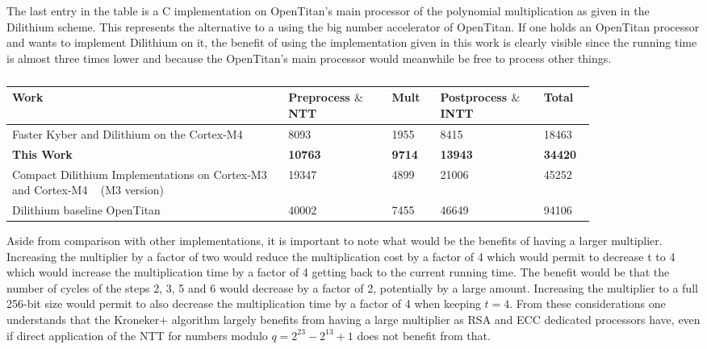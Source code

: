 The last entry in the table is a C implementation on OpenTitan's main processor of the polynomial multiplication as given in the Dilithium scheme. This represents the alternative to a using the big number accelerator of OpenTitan. If one holds an OpenTitan processor and wants to implement Dilithium on it, the benefit of using the implementation given in this work is clearly visible since the running time is almost three times lower and because the OpenTitan's main processor would meanwhile be free to process other things. 


\begin{table}[htpb]
    \caption[]{}\label{tab:comparison}
    \centering
    \begin{tabular}{p{0.4\linewidth} | p{0.15\linewidth} | p{0.07\linewidth} | p{0.15\linewidth} | p{0.07\linewidth}}
      \toprule
         Work & Preprocess $\&$ NTT & Mult & Postprocess $\&$ INTT & Total \\
      \midrule
         Faster Kyber and Dilithium on the Cortex-M4~\parencite{10.1007/978-3-031-09234-3_42} & 8093 & 1955 & 8415 & 18463  \\
         \hline
         \textbf{This Work} & \textbf{10763} & \textbf{9714} & \textbf{13943} & \textbf{34420} \\
         \hline
         Compact Dilithium Implementations on Cortex-M3 and Cortex-M4 ~\parencite{cryptoeprint:2020/1278} (M3 version) & 19347 & 4899 & 21006 & 45252 \\
         \hline 
         Dilithium baseline OpenTitan & 40002 & 7455 & 46649 & 94106 \\

      \bottomrule
    \end{tabular}
  \end{table}

  Aside from comparison with other implementations, it is important to note what would be the benefits of having a larger multiplier. Increasing the multiplier by a factor of two would reduce the multiplication cost by a factor of 4 which would permit to decrease t to 4 which would increase the multiplication time by a factor of 4 getting back to the current running time. The benefit would be that the number of cycles of the steps 2, 3, 5 and 6 would decrease by a factor of 2, potentially by a large amount. Increasing the multiplier to a full 256-bit size would permit to also decrease the multiplication time by a factor of 4 when keeping $t=4$. From these considerations one understands that the Kroneker+ algorithm largely benefits from having a large multiplier as RSA and ECC dedicated processors have, even if direct application of the NTT for numbers modulo $q = 2^{23} - 2^{13} + 1$ does not benefit from that.